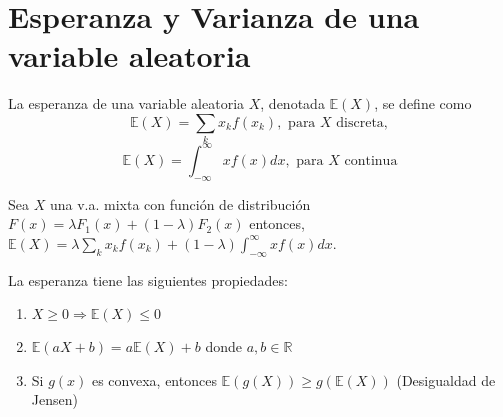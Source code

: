\begin{ejr}

\end{ejr}

\begin{ejr}

\end{ejr}

\begin{ejr}

\end{ejr}

\begin{ejr}

\end{ejr}

\begin{ejr}

\end{ejr}

\begin{ejr}

\end{ejr}

\begin{ejr}

\end{ejr}

\section{Esperanza y Varianza de una variable aleatoria}

\begin{defn}[Esperanza]
La esperanza de una variable aleatoria $X$, denotada $\mathbb{E}(X)$, se define como \[ \mathbb{E}(X) = \sum_k x_kf(x_k) ,\text{ para $X$ discreta} ,\] \[ \mathbb{E}(X) = \int_{-\infty}^\infty xf(x)dx ,\text{ para $X$ continua}\]
\end{defn}

\begin{obs}
Sea $X$ una v.a. mixta con función de distribución $F(x) = \lambda F_1(x) + (1-\lambda)F_2(x)$ entonces, $\mathbb{E}(X) = \lambda \sum_k x_kf(x_k) + (1-\lambda)\int_{-\infty}^\infty xf(x)dx$.
\end{obs}

\begin{theo}
La esperanza tiene las siguientes propiedades:

\begin{enumerate}[label=(\roman*)]
    \item $X\geq0 \Rightarrow \mathbb{E}(X) \leq 0$
    \item $\mathbb{E}(aX + b) = a\mathbb{E}(X) + b$ donde $a,b\in\mathbb{R}$
    \item Si $g(x)$ es convexa, entonces $\mathbb{E}(g(X)) \geq g(\mathbb{E}(X))$ (Desigualdad de Jensen)
\end{enumerate}
\end{theo}


